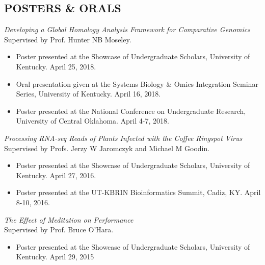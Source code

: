 \documentclass[margin, 10pt]{res} %
\begin{document}
\begin{resume}

\section{POSTERS \& ORALS} %

{\sl Developing a Global Homology Analysis Framework for Comparative Genomics} \\
Supervised by Prof. Hunter NB Moseley.
\begin{itemize} \itemsep -2pt %
\item Poster presented at the Showcase of Undergraduate Scholars, University of Kentucky. April 25, 2018.
\item Oral presentation given at the Systems Biology \& Omics Integration Seminar Series, University of Kentucky. April 16, 2018.
\item Poster presented at the National Conference on Undergraduate Research, University of Central Oklahoma. April 4-7, 2018.
\end{itemize}

{\sl Processing RNA-seq Reads of Plants Infected with the Coffee Ringspot Virus} \\
Supervised by Profs. Jerzy W Jaromczyk and Michael M Goodin.
\begin{itemize} \itemsep -2pt %
\item Poster presented at the Showcase of Undergraduate Scholars, University of Kentucky. April 27, 2016.
\item Poster presented at the UT-KBRIN Bioinformatics Summit, Cadiz, KY. April 8-10, 2016.
\end{itemize}

{\sl The Effect of Meditation on Performance} \\
Supervised by Prof. Bruce O’Hara.
\begin{itemize} \itemsep -2pt %
\item Poster presented at the Showcase of Undergraduate Scholars, University of Kentucky. April 29, 2015
\end{itemize}



\end{resume}
\end{document}
